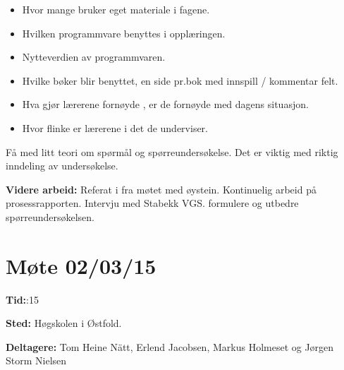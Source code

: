 \begin{itemize}

\item Hvor mange bruker eget materiale i fagene.
\item Hvilken programmvare benyttes i opplæringen.
\item Nytteverdien av programmvaren.
\item Hvilke bøker blir benyttet, en side pr.bok med innspill / kommentar felt.
\item Hva gjør lærerene fornøyde , er de fornøyde med dagens situasjon.
\item Hvor flinke er lærerene i det de underviser.

\end{itemize}

\hspace{-17pt}Få med litt teori om spørmål og spørreundersøkelse.\newline 
Det er viktig med riktig inndeling av undersøkelse.\newline

\vspace{20pt}

\hspace{-17pt}\textbf{Videre arbeid:}\newline
Referat i fra møtet med øystein.\newline
Kontinuelig arbeid på prosessrapporten.\newline
Intervju med Stabekk VGS.\newline
formulere og utbedre spørreundersøkelsen.\newline
\newpage






\section{Møte 02/03/15}

\vspace{30pt}
\textbf{Tid:}:15\newline

\hspace{-17pt}\textbf{Sted:}\newline 
Høgskolen i Østfold.\newline

\hspace{-17pt}\textbf{Deltagere:}\newline 
Tom Heine Nätt, Erlend Jacobsen, Markus Holmeset og Jørgen Storm Nielsen\newline

